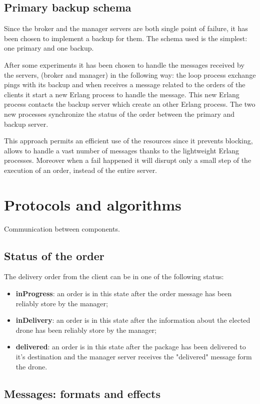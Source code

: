 \documentclass[a4paper, oneside]{memoir}
\begin{document}
\subsection{Primary backup schema}
Since the broker and the manager servers are both single point of failure, it has been chosen to implement a backup for them. The schema used is the simplest: one primary and one backup.

After some experiments it has been chosen to handle the messages received by the servers, (broker and manager) in the following way: the loop process exchange pings with its backup and when receives a message related to the orders of the clients it start a new Erlang process to handle the message. This new Erlang process contacts the backup server which create an other Erlang process. The two new processes synchronize the status of the order between the primary and backup server.

This approach permits an efficient use of the resources since it prevents blocking, allows to handle a vast number of messages thanks to the lightweight Erlang processes. Moreover when a fail happened it will disrupt only a small step of the execution of an order, instead of the entire server.


\section{Protocols and algorithms}
Communication between components.

\subsection{Status of the order}
The delivery order from the client can be in one of the following status:
\begin{itemize}
\item \textbf{inProgress}: an order is in this state after the order message has been reliably store by the manager;
\item \textbf{inDelivery}: an order is in this state after the information about the elected drone has been reliably store by the manager;
\item \textbf{delivered}: an order is in this state after the package has been delivered to it's destination and the manager server receives the "delivered" message form the drone.
\end{itemize}


\newpage
\subsection{Messages: formats and effects}
\end{document}
